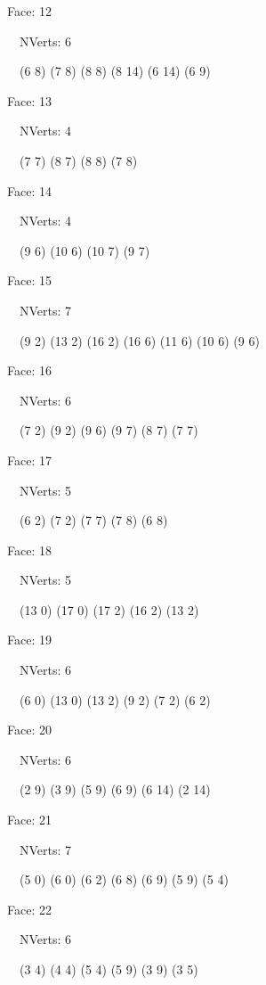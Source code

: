 \documentclass{article}
\begin{document}
{\footnotesize 

Face: 12

\   \    NVerts: 6

 \   \   (6 8) (7 8) (8 8) (8 14) (6 14) (6 9)}

{\footnotesize 

Face: 13

\   \    NVerts: 4

 \   \   (7 7) (8 7) (8 8) (7 8)}

{\footnotesize 

Face: 14

\   \    NVerts: 4

 \   \   (9 6) (10 6) (10 7) (9 7)}

{\footnotesize 

Face: 15

\   \    NVerts: 7

 \   \   (9 2) (13 2) (16 2) (16 6) (11 6) (10 6) (9 6)}

{\footnotesize 

Face: 16

\   \    NVerts: 6

 \   \   (7 2) (9 2) (9 6) (9 7) (8 7) (7 7)}

{\footnotesize 

Face: 17

\   \    NVerts: 5

 \   \   (6 2) (7 2) (7 7) (7 8) (6 8)}

{\footnotesize 

Face: 18

\   \    NVerts: 5

 \   \   (13 0) (17 0) (17 2) (16 2) (13 2)}

{\footnotesize 

Face: 19

\   \    NVerts: 6

 \   \   (6 0) (13 0) (13 2) (9 2) (7 2) (6 2)}

{\footnotesize 

Face: 20

\   \    NVerts: 6

 \   \   (2 9) (3 9) (5 9) (6 9) (6 14) (2 14)}

{\footnotesize 

Face: 21

\   \    NVerts: 7

 \   \   (5 0) (6 0) (6 2) (6 8) (6 9) (5 9) (5 4)}

{\footnotesize 

Face: 22

\   \    NVerts: 6

 \   \   (3 4) (4 4) (5 4) (5 9) (3 9) (3 5)}
\end{document}

